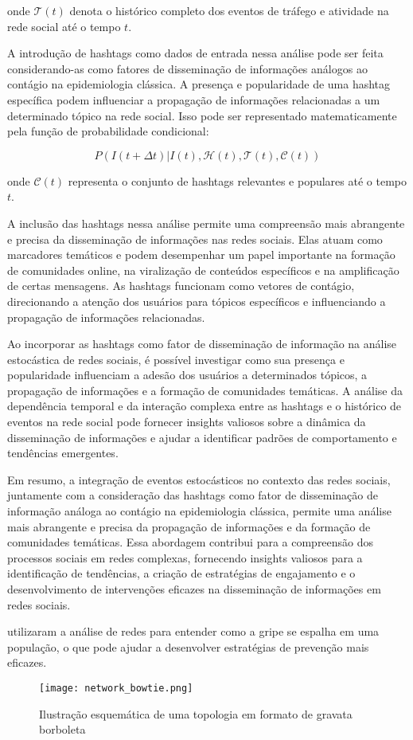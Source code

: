 onde $\mathcal{T}(t)$ denota o histórico completo dos eventos de tráfego e atividade na rede social até o tempo $t$.

A introdução de hashtags como dados de entrada nessa análise pode ser feita considerando-as como fatores de disseminação de informações análogos ao contágio na epidemiologia clássica. A presença e popularidade de uma hashtag específica podem influenciar a propagação de informações relacionadas a um determinado tópico na rede social. Isso pode ser representado matematicamente pela função de probabilidade condicional:

\begin{equation}
	P(I(t+\Delta t)|I(t), \mathcal{H}(t), \mathcal{T}(t), \mathcal{C}(t))
\end{equation}

onde $\mathcal{C}(t)$ representa o conjunto de hashtags relevantes e populares até o tempo $t$.

A inclusão das hashtags nessa análise permite uma compreensão mais abrangente e precisa da disseminação de informações nas redes sociais. Elas atuam como marcadores temáticos e podem desempenhar um papel importante na formação de comunidades online, na viralização de conteúdos específicos e na amplificação de certas mensagens. As hashtags funcionam como vetores de contágio, direcionando a atenção dos usuários para tópicos específicos e influenciando a propagação de informações relacionadas.

Ao incorporar as hashtags como fator de disseminação de informação na análise estocástica de redes sociais, é possível investigar como sua presença e popularidade influenciam a adesão dos usuários a determinados tópicos, a propagação de informações e a formação de comunidades temáticas. A análise da dependência temporal e da interação complexa entre as hashtags e o histórico de eventos na rede social pode fornecer insights valiosos sobre a dinâmica da disseminação de informações e ajudar a identificar padrões de comportamento e tendências emergentes.

Em resumo, a integração de eventos estocásticos no contexto das redes sociais, juntamente com a consideração das hashtags como fator de disseminação de informação análoga ao contágio na epidemiologia clássica, permite uma análise mais abrangente e precisa da propagação de informações e da formação de comunidades temáticas. Essa abordagem contribui para a compreensão dos processos sociais em redes complexas, fornecendo insights valiosos para a identificação de tendências, a criação de estratégias de engajamento e o desenvolvimento de intervenções eficazes na disseminação de informações em redes sociais.

 utilizaram a análise de redes para entender como a gripe se espalha em uma população, o que pode ajudar a desenvolver estratégias de prevenção mais eficazes.
\begin{figure}[!htb]
	\caption{Ilustração esquemática de uma topologia em formato de gravata borboleta}
	\label{fig:network_bowtie}
	\centering
	\texttt{[image: network\_bowtie.png]}
\end{figure}